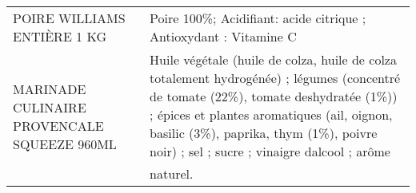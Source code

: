 \begin{longtable}{p{5cm}p{10cm}}
                                                                             POIRE WILLIAMS ENTIÈRE 1 KG  &                                                                                                                                                                                                                                                                                                                                                                                                                                                                                                                                                                                                                                                                                                                                                                                                                                                                                                                                                                        Poire 100\%; Acidifiant: acide citrique ; Antioxydant : Vitamine C \\
                                                             MARINADE CULINAIRE PROVENCALE  SQUEEZE 960ML &                                                                                                                                                                                                                                                                                                                                                                                                                                                                                                                                                                                                                                                                                                                                                     Huile végétale (huile de colza, huile de colza totalement hydrogénée) ; légumes (concentré de tomate (22\%), tomate deshydratée (1\%)) ; épices et plantes aromatiques (ail, oignon, basilic (3\%), paprika, thym (1\%), poivre noir) ; sel ; sucre ; vinaigre dalcool ; arôme naturel. \\

\end{longtable}
